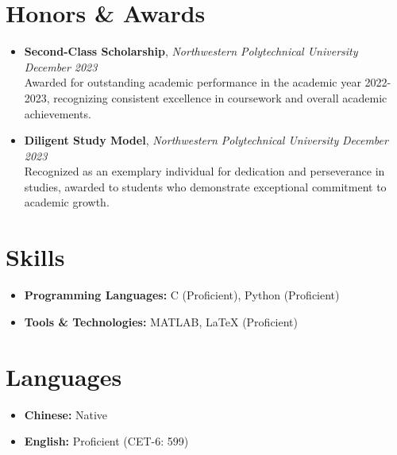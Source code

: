 \documentclass[a4paper,10pt]{article}
\begin{document}
\section*{Honors \& Awards}
\begin{itemize}[leftmargin=0.5cm]
    \item \textbf{Second-Class Scholarship}, \textit{Northwestern Polytechnical University} \hfill \textit{December 2023} \\
    Awarded for outstanding academic performance in the academic year 2022-2023, recognizing consistent excellence in coursework and overall academic achievements.

    \item \textbf{Diligent Study Model}, \textit{Northwestern Polytechnical University} \hfill \textit{December 2023} \\
    Recognized as an exemplary individual for dedication and perseverance in studies, awarded to students who demonstrate exceptional commitment to academic growth.
\end{itemize}

\section*{Skills}
\begin{itemize}[leftmargin=0.5cm]
    \item \textbf{Programming Languages:} C (Proficient), Python (Proficient)
    \item \textbf{Tools \& Technologies:} MATLAB, LaTeX (Proficient)
\end{itemize}

\section*{Languages}
\begin{itemize}[leftmargin=0.5cm]
	\item \textbf{Chinese:} Native
	\item \textbf{English:} Proficient (CET-6: 599)
\end{itemize}

\end{document}
